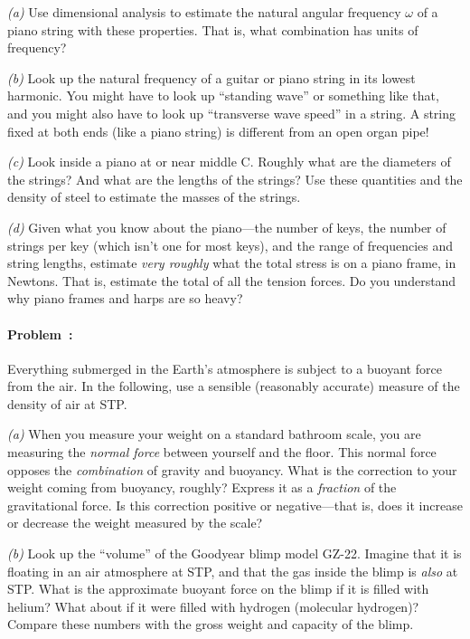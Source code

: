 \documentclass[12pt]{article}
\begin{document}
\textsl{(a)} Use dimensional analysis to estimate the natural angular
frequency $\omega$ of a piano string with these properties. That is,
what combination has units of frequency?

\textsl{(b)} Look up the natural frequency of a guitar or piano string
in its lowest harmonic. You might have to look up ``standing wave'' or
something like that, and you might also have to look up ``transverse
wave speed'' in a string. A string fixed at both ends (like a piano
string) is different from an open organ pipe!

\textsl{(c)} Look inside a piano at or near middle C. Roughly what are
the diameters of the strings? And what are the lengths of the strings?
Use these quantities and the density of steel to estimate the masses
of the strings.

\textsl{(d)} Given what you know about the piano---the number of keys,
the number of strings per key (which isn't one for most keys), and the
range of frequencies and string lengths, estimate \emph{very roughly}
what the total stress is on a piano frame, in Newtons. That is,
estimate the total of all the tension forces. Do you understand why
piano frames and harps are so heavy?

\paragraph{Problem~\theproblem:}%
Everything submerged in the Earth's atmosphere is subject to a buoyant
force from the air.  In the following, use a sensible (reasonably
accurate) measure of the density of air at STP.

\textsl{(a)} When you measure your weight on a standard bathroom
scale, you are measuring the \emph{normal force} between yourself and
the floor.  This normal force opposes the \emph{combination} of
gravity and buoyancy.  What is the correction to your weight coming
from buoyancy, roughly?  Express it as a \emph{fraction} of the
gravitational force.  Is this correction positive or negative---that
is, does it increase or decrease the weight measured by the scale?

\textsl{(b)} Look up the ``volume'' of the Goodyear blimp model GZ-22.
Imagine that it is floating in an air atmosphere at STP, and that the
gas inside the blimp is \emph{also} at STP.  What is the approximate
buoyant force on the blimp if it is filled with helium?  What about if
it were filled with hydrogen (molecular hydrogen)?  Compare these
numbers with the gross weight and capacity of the blimp.
\end{document}
